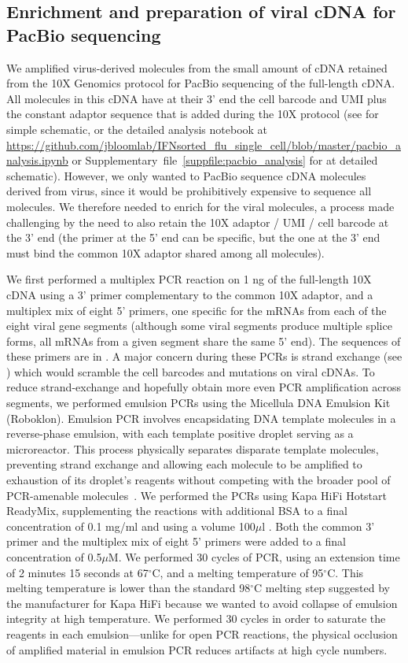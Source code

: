 \documentclass[9pt,lineno]{elife}
\begin{document}
\subsection{Enrichment and preparation of viral cDNA for PacBio sequencing}
We amplified virus-derived molecules from the small amount of cDNA retained from the 10X Genomics protocol for PacBio sequencing of the full-length cDNA.
All molecules in this cDNA have at their 3' end the cell barcode and UMI plus the constant adaptor sequence that is added during the 10X protocol (see  for simple schematic, or the detailed analysis notebook at \url{https://github.com/jbloomlab/IFNsorted_flu_single_cell/blob/master/pacbio_analysis.ipynb} or Supplementary~file~\ref{suppfile:pacbio_analysis} for at detailed schematic).
However, we only wanted to PacBio sequence cDNA molecules derived from virus, since it would be prohibitively expensive to sequence all molecules.
We therefore needed to enrich for the viral molecules, a process made challenging by the need to also retain the 10X adaptor / UMI / cell barcode at the 3' end (the primer at the 5' end can be specific, but the one at the 3' end must bind the common 10X adaptor shared among all molecules).

We first performed a multiplex PCR reaction on 1 ng of the full-length 10X cDNA using a 3' primer complementary to the common 10X adaptor, and a multiplex mix of eight 5' primers, one specific for the mRNAs from each of the eight viral gene segments (although some viral segments produce multiple splice forms, all mRNAs from a given segment share the same 5' end).
The sequences of these primers are in .
A major concern during these PCRs is strand exchange (see ) which would scramble the cell barcodes and mutations on viral cDNAs.
To reduce strand-exchange and hopefully obtain more even PCR amplification across segments, we performed emulsion PCRs using the Micellula DNA Emulsion Kit (Roboklon).
Emulsion PCR involves encapsidating DNA template molecules in a reverse-phase emulsion, with each template positive droplet serving as a microreactor.
This process physically separates disparate template molecules, preventing strand exchange and allowing each molecule to be amplified to exhaustion of its droplet's reagents without competing with the broader pool of PCR-amenable molecules~\citep{Boers:2015emulsion}.
We performed the PCRs using Kapa HiFi Hotstart ReadyMix, supplementing the reactions with additional BSA to a final concentration of 0.1 mg/ml and using a volume 100$\mu$l .
Both the common 3' primer and the multiplex mix of eight 5' primers were added to a final concentration of 0.5$\mu$M.
We performed 30 cycles of PCR, using an extension time of 2 minutes 15 seconds at 67$^{\circ}$C, and a melting temperature of 95$^{\circ}$C.
This melting temperature is lower than the standard 98$^{\circ}$C melting step suggested by the manufacturer for Kapa HiFi because we wanted to avoid collapse of emulsion integrity at high temperature.
We performed 30 cycles in order to saturate the reagents in each emulsion---unlike for open PCR reactions, the physical occlusion of amplified material in emulsion PCR reduces artifacts at high cycle numbers.
\end{document}
